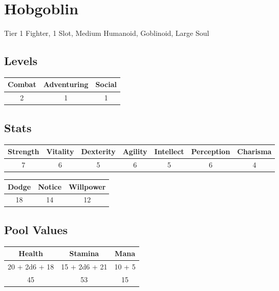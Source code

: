 \section{Hobgoblin}
Tier 1 Fighter, 1 Slot, Medium Humanoid, Goblinoid, Large Soul\\

\subsection{Levels}
\begin{minipage}[H]{1\textwidth}
	\centering
	\begin{tabular}[c]{|c | c | c|}
		\hline
		Combat & Adventuring & Social\\
		\hline
		2 & 1 & 1\\
		\hline
	\end{tabular}
\end{minipage}

\subsection{Stats}
\begin{minipage}[H]{1\textwidth}
	\centering
	\begin{tabular}[c]{|c | c | c | c | c | c | c|}
		\hline
		Strength & Vitality & Dexterity & Agility & Intellect & Perception & Charisma\\
		\hline
		7 & 6 & 5 & 6 & 5 & 6 & 4\\
		\hline
	\end{tabular}
\end{minipage}
\bigbreak

\begin{minipage}[H]{1\textwidth}
	\centering
	\begin{tabular}[c]{|c | c | c|}
		\hline
		Dodge & Notice & Willpower\\
		\hline
		18 & 14 & 12\\
		\hline
	\end{tabular}
\end{minipage}

\subsection{Pool Values}
\bigbreak
\begin{minipage}[H]{1\textwidth}
	\centering
	\begin{tabular}[c]{|c | c | c|}
		\hline
		Health & Stamina & Mana\\
		\hline
		20 + 2d6 + 18 & 15 + 2d6 + 21 & 10 + 5 \\
		45 & 53 & 15\\
		\hline
	\end{tabular}
\end{minipage}
\noindent

